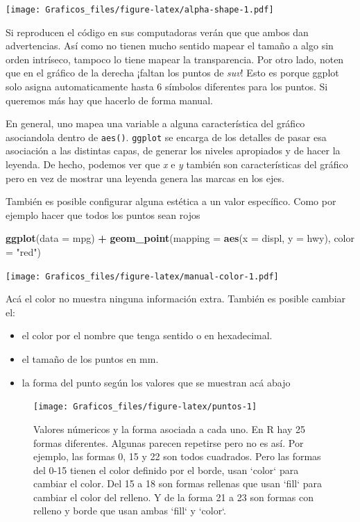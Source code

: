 \documentclass[]{book}
\newenvironment{Shaded}{\begin{snugshade}}{\end{snugshade}}
\newcommand{\DataTypeTok}[1]{\textcolor[rgb]{0.13,0.29,0.53}{#1}}
\newcommand{\KeywordTok}[1]{\textcolor[rgb]{0.13,0.29,0.53}{\textbf{#1}}}
\newcommand{\NormalTok}[1]{#1}
\newcommand{\OperatorTok}[1]{\textcolor[rgb]{0.81,0.36,0.00}{\textbf{#1}}}
\newcommand{\StringTok}[1]{\textcolor[rgb]{0.31,0.60,0.02}{#1}}
\providecommand{\tightlist}{%
  \setlength{\itemsep}{0pt}\setlength{\parskip}{0pt}}
\theoremstyle{definition}
\theoremstyle{definition}
\theoremstyle{definition}
\theoremstyle{remark}
\begin{document}
\texttt{[image: Graficos\_files/figure-latex/alpha-shape-1.pdf]}

Si reproducen el código en sus computadoras verán que que ambos dan
advertencias. Así como no tienen mucho sentido mapear el tamaño a algo
sin orden intríseco, tampoco lo tiene mapear la transparencia. Por otro
lado, noten que en el gráfico de la derecha ¡faltan los puntos de
\emph{suv}! Esto es porque ggplot solo asigna automaticamente hasta 6
símbolos diferentes para los puntos. Si queremos más hay que hacerlo de
forma manual.

En general, uno mapea una variable a alguna característica del gráfico
asociandola dentro de \texttt{aes()}. \texttt{ggplot} se encarga de los
detalles de pasar esa asociación a las distintas capas, de generar los
niveles apropiados y de hacer la leyenda. De hecho, podemos ver que
\emph{x} e \emph{y} también son características del gráfico pero en vez
de mostrar una leyenda genera las marcas en los ejes.

También es posible configurar alguna estética a un valor específico.
Como por ejemplo hacer que todos los puntos sean rojos

\begin{Shaded}
\begin{Highlighting}[]
\KeywordTok{ggplot}\NormalTok{(}\DataTypeTok{data =}\NormalTok{ mpg) }\OperatorTok{+}\StringTok{ }
\StringTok{  }\KeywordTok{geom_point}\NormalTok{(}\DataTypeTok{mapping =} \KeywordTok{aes}\NormalTok{(}\DataTypeTok{x =}\NormalTok{ displ, }\DataTypeTok{y =}\NormalTok{ hwy), }\DataTypeTok{color =} \StringTok{"red"}\NormalTok{)}
\end{Highlighting}
\end{Shaded}

\texttt{[image: Graficos\_files/figure-latex/manual-color-1.pdf]}

Acá el color no muestra ninguna información extra. También es posible
cambiar el:

\begin{itemize}
\tightlist
\item
  el color por el nombre que tenga sentido o en hexadecimal.
\item
  el tamaño de los puntos en mm.
\item
  la forma del punto según los valores que se muestran acá abajo
\end{itemize}

\begin{figure}
\texttt{[image: Graficos\_files/figure-latex/puntos-1]} \caption{Valores númericos y la forma asociada a cada uno. En R hay 25 formas diferentes. Algunas parecen repetirse pero no es así. Por ejemplo, las formas 0, 15 y 22 son todos cuadrados. Pero las formas del 0-15 tienen el color definido por el borde, usan `color` para cambiar el color. Del 15 a 18 son formas rellenas que usan `fill` para cambiar el color del relleno. Y de la forma 21 a 23 son formas con relleno y borde que usan ambas `fill` y `color`.}\label{fig:puntos}
\end{figure}
\end{document}
